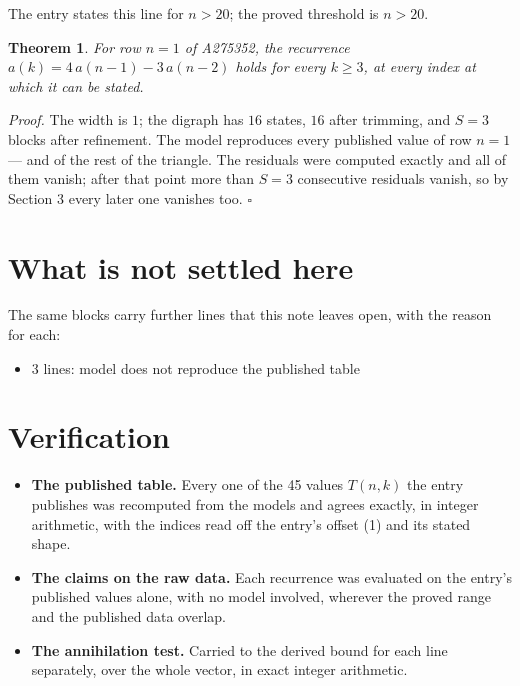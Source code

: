 \documentclass[11pt]{article}
\newtheorem{theorem}{Theorem}
\theoremstyle{definition}
\begin{document}
The entry states this line for $n > 20$; the proved threshold is $n > 20$.

\begin{theorem} For row $n = 1$ of A275352, the recurrence $a(k) = 4\,a(n-1) - 3\,a(n-2)$ holds for every $k \ge 3$, at every index at which it can be stated.\end{theorem}

{\itshape Proof.} The width is $1$; the digraph has $16$ states, $16$ after trimming, and $S = 3$ blocks after refinement. The model reproduces every published value of row $n = 1$ --- and of the rest of the triangle. The residuals were computed exactly and all of them vanish; after that point more than $S = 3$ consecutive residuals vanish, so by Section 3 every later one vanishes too. $\square$

\section{What is not settled here}

The same blocks carry further lines that this note leaves open, with the reason for each:

\begin{itemize}

\item 3 lines: model does not reproduce the published table

\end{itemize}

\section{Verification}

\begin{itemize}

\item {\bfseries The published table.} Every one of the 45 values $T(n,k)$ the entry publishes was recomputed from the models and agrees exactly, in integer arithmetic, with the indices read off the entry's offset (1) and its stated shape.

\item {\bfseries The claims on the raw data.} Each recurrence was evaluated on the entry's published values alone, with no model involved, wherever the proved range and the published data overlap.

\item {\bfseries The annihilation test.} Carried to the derived bound for each line separately, over the whole vector, in exact integer arithmetic.

\end{itemize}
\end{document}
